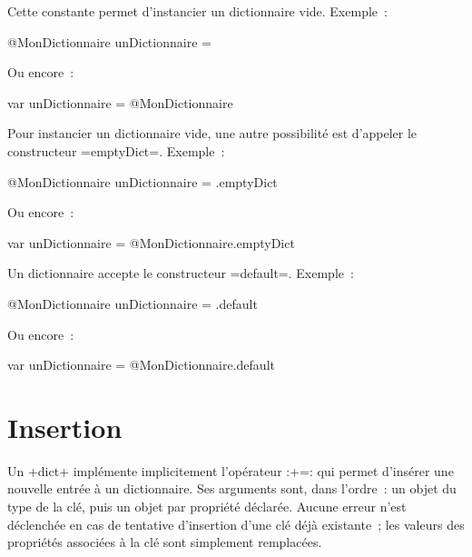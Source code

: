 
Cette constante permet d'instancier un dictionnaire vide. Exemple~:
\begin{galgas}
@MonDictionnaire unDictionnaire = {}
\end{galgas}

Ou encore~:

\begin{galgas}
var unDictionnaire = @MonDictionnaire {}
\end{galgas}


Pour instancier un dictionnaire vide, une autre possibilité est d'appeler le constructeur \ggs=emptyDict=. Exemple~:
\begin{galgas}
@MonDictionnaire unDictionnaire = .emptyDict
\end{galgas}

Ou encore~:

\begin{galgas}
var unDictionnaire = @MonDictionnaire.emptyDict
\end{galgas}

 



Un dictionnaire accepte le constructeur \ggs=default=. Exemple~:
\begin{galgas}
@MonDictionnaire unDictionnaire = .default
\end{galgas}

Ou encore~:

\begin{galgas}
var unDictionnaire = @MonDictionnaire.default
\end{galgas}

 




\section{Insertion}

Un \ggs+dict+ implémente implicitement l'opérateur \ggs:+=: qui permet d'insérer une nouvelle entrée à un dictionnaire. Ses arguments sont, dans l'ordre~: un objet du type de la clé, puis un objet par propriété déclarée. Aucune erreur n'est déclenchée en cas de tentative d'insertion d'une clé déjà existante~; les valeurs des propriétés associées à la clé sont simplement remplacées.


